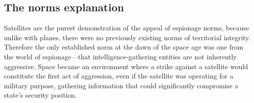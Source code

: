 \documentclass[11pt]{memoir}
\begin{document}
\subsection{The norms explanation}
Satellites are the purest demonstration of the appeal of espionage norms, because unlike with planes, there were no previously existing norms of territorial integrity. Therefore the only established norm at the dawn of the space age was one from the world of espionage---that intelligence-gathering entities are not inherently aggressive. Space became an environment where a strike against a satellite would constitute the first act of aggression, even if the satellite was operating for a military purpose, gathering information that could significantly compromise a state's security position.


\end{document}
